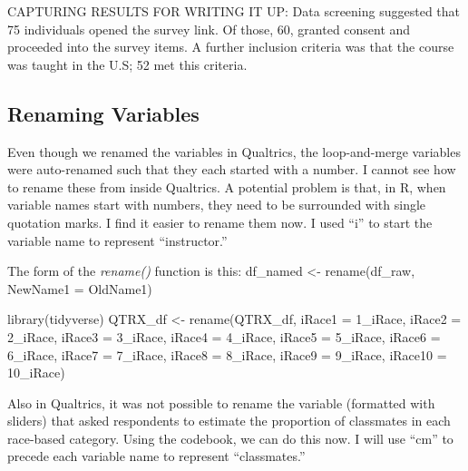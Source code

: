 \documentclass[
]{book}
\newenvironment{Shaded}{\begin{snugshade}}{\end{snugshade}}
\newcommand{\AttributeTok}[1]{\textcolor[rgb]{0.77,0.63,0.00}{#1}}
\newcommand{\FunctionTok}[1]{\textcolor[rgb]{0.00,0.00,0.00}{#1}}
\newcommand{\NormalTok}[1]{#1}
\newcommand{\OtherTok}[1]{\textcolor[rgb]{0.56,0.35,0.01}{#1}}
\newcommand{\StringTok}[1]{\textcolor[rgb]{0.31,0.60,0.02}{#1}}
\begin{document}
CAPTURING RESULTS FOR WRITING IT UP: Data screening suggested that 75 individuals opened the survey link. Of those, 60, granted consent and proceeded into the survey items. A further inclusion criteria was that the course was taught in the U.S; 52 met this criteria.

\hypertarget{renaming-variables}{%
\subsection{Renaming Variables}\label{renaming-variables}}

Even though we renamed the variables in Qualtrics, the loop-and-merge variables were auto-renamed such that they each started with a number. I cannot see how to rename these from inside Qualtrics. A potential problem is that, in R, when variable names start with numbers, they need to be surrounded with single quotation marks. I find it easier to rename them now. I used ``i'' to start the variable name to represent ``instructor.''

The form of the \emph{rename()} function is this:
df\_named \textless- rename(df\_raw, NewName1 = OldName1)

\begin{Shaded}
\begin{Highlighting}[]
\FunctionTok{library}\NormalTok{(tidyverse)}
\NormalTok{QTRX\_df }\OtherTok{\textless{}{-}} \FunctionTok{rename}\NormalTok{(QTRX\_df, }\AttributeTok{iRace1 =} \StringTok{\textquotesingle{}1\_iRace\textquotesingle{}}\NormalTok{, }\AttributeTok{iRace2 =} \StringTok{\textquotesingle{}2\_iRace\textquotesingle{}}\NormalTok{, }\AttributeTok{iRace3 =} \StringTok{\textquotesingle{}3\_iRace\textquotesingle{}}\NormalTok{, }\AttributeTok{iRace4 =} \StringTok{\textquotesingle{}4\_iRace\textquotesingle{}}\NormalTok{, }\AttributeTok{iRace5 =} \StringTok{\textquotesingle{}5\_iRace\textquotesingle{}}\NormalTok{, }\AttributeTok{iRace6 =} \StringTok{\textquotesingle{}6\_iRace\textquotesingle{}}\NormalTok{, }\AttributeTok{iRace7 =} \StringTok{\textquotesingle{}7\_iRace\textquotesingle{}}\NormalTok{, }\AttributeTok{iRace8 =} \StringTok{\textquotesingle{}8\_iRace\textquotesingle{}}\NormalTok{, }\AttributeTok{iRace9 =} \StringTok{\textquotesingle{}9\_iRace\textquotesingle{}}\NormalTok{, }\AttributeTok{iRace10 =} \StringTok{\textquotesingle{}10\_iRace\textquotesingle{}}\NormalTok{)}
\end{Highlighting}
\end{Shaded}

Also in Qualtrics, it was not possible to rename the variable (formatted with sliders) that asked respondents to estimate the proportion of classmates in each race-based category. Using the codebook, we can do this now. I will use ``cm'' to precede each variable name to represent ``classmates.''
\end{document}
